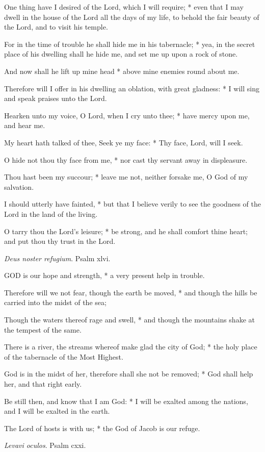 One thing have I desired of the Lord, which I will
require; * even that I may dwell in the house of the Lord all the days
of my life, to behold the fair beauty of the Lord, and to visit his
temple.

For in the time of trouble he shall hide me in his
tabernacle; * yea, in the secret place of his dwelling shall he hide
me, and set me up upon a rock of stone.

And now shall he lift up mine head * above mine enemies
round about me.

Therefore will I offer in his dwelling an oblation,
with great gladness: * I will sing and speak praises unto the Lord.

Hearken unto my voice, O Lord, when I cry unto thee;
* have mercy upon me, and hear me.

My heart hath talked of thee, Seek ye my face: *
Thy face, Lord, will I seek.

O hide not thou thy face from me, * nor cast thy
servant away in displeasure.

Thou hast been my succour; * leave me not, neither
forsake me, O God of my salvation.

I should utterly have fainted, * but that I believe
verily to see the goodness of the Lord in the land of the living.

O tarry thou the Lord’s leisure; * be strong,
and he shall comfort thine heart; and put thou thy trust in the Lord.

\emph{Deus noster refugium}. Psalm xlvi.

GOD is our hope and strength,
* a very present help in trouble.

Therefore will we not fear, though the earth be moved,
* and though the hills be carried into the midst of the sea;

Though the waters thereof rage and swell, * and though
the mountains shake at the tempest of the same.

There is a river, the streams whereof make glad the
city of God; * the holy place of the tabernacle of the Most Highest.

God is in the midst of her, therefore shall she not
be removed; * God shall help her, and that right early.

Be still then, and know that I am God: * I will be
exalted among the nations, and I will be exalted in the earth.

The Lord of hosts is with us; * the God of Jacob is
our refuge.

\emph{Levavi oculos}. Psalm cxxi.

